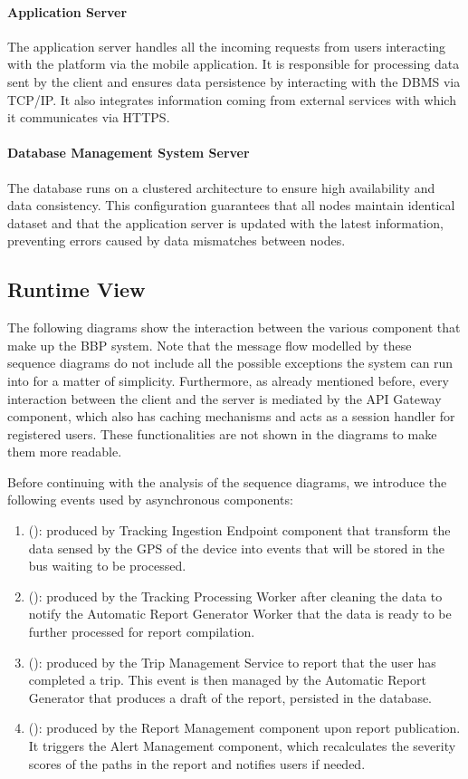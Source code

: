 \paragraph{Application Server}
The application server handles all the incoming requests from users interacting with the platform via the mobile application. It is responsible for processing data sent by the client and ensures data persistence by interacting with the DBMS via TCP/IP. It also integrates information coming from external services with which it communicates via HTTPS.

\paragraph{Database Management System Server}
The database runs on a clustered architecture to ensure high availability and data consistency. This configuration guarantees that all nodes maintain identical dataset and that the application server is updated with the latest information, preventing errors caused by data mismatches between nodes.

\subsection{Runtime View}
The following diagrams show the interaction between the various component that make up the BBP system. Note that the message flow modelled by these sequence diagrams do not include all the possible exceptions the system can run into for a matter of simplicity. Furthermore, as already mentioned before, every interaction between the client and the server is mediated by the API Gateway component, which also has caching mechanisms and acts as a session handler for registered users. These functionalities are not shown in the diagrams to make them more readable.

Before continuing with the analysis of the sequence diagrams, we introduce the following events used by asynchronous components:
\begin{enumerate}
    \item {} (): produced by Tracking Ingestion Endpoint component that transform the data sensed by the GPS of the device into events that will be stored in the bus waiting to be processed.
    \item {} (): produced by the Tracking Processing Worker after cleaning the data to notify the Automatic Report Generator Worker that the data is ready to be further processed for report compilation.
    \item {} (): produced by the Trip Management Service to report that the user has completed a trip. This event is then managed by the Automatic Report Generator that produces a draft of the report, persisted in the database.
    \item {} (): produced by the Report Management component upon report publication. It triggers the Alert Management component, which recalculates the severity scores of the paths in the report and notifies users if needed.
\end{enumerate}

